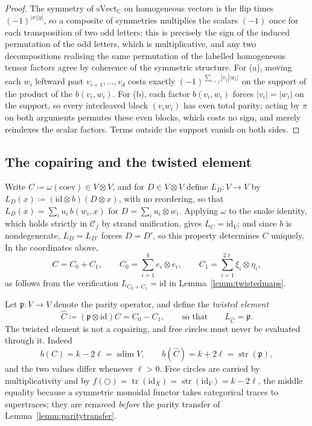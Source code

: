 \documentclass[11pt]{article}
\newcommand{\freecircle}{\bigcirc}
\newcommand{\conncat}{\mathcal{C}_{f}}            %
\newcommand{\genX}{X}                             %
\newcommand{\tr}{\operatorname{tr}}
\newcommand{\fib}{\omega}                         %
\newcommand{\svect}{\mathrm{sVect}_{\mathbb{C}}}
\newcommand{\str}{\operatorname{str}}
\newcommand{\parityop}{\mathfrak{p}}              %
\newcommand{\copair}{C}                           %
\newcommand{\twistedC}{\widehat{C}}               %
\begin{document}
\begin{proof}
The symmetry of $\svect$ on homogeneous vectors is the flip times
$(-1)^{|x||y|}$, so a composite of symmetries multiplies the
scalars $(-1)$ once for each transposition of two odd letters;
this is precisely the sign of the induced permutation of the odd
letters, which is multiplicative, and any two decompositions
realising the same permutation of the labelled homogeneous
tensor factors agree by coherence of the symmetric structure. For (a), moving each $w_{i}$ leftward past
$v_{i+1},\dotsc,v_{d}$ costs exactly
$(-1)^{\sum_{i<j}|v_{j}||w_{i}|}$ on the support of the product of
the $b(v_{i},w_{i})$. For (b), each factor $b(v_{i},w_{i})$
forces $|v_{i}|=|w_{i}|$ on the support, so every interleaved
block $(v_{i}w_{i})$ has even total parity; acting by $\pi$ on
both arguments permutes these even blocks, which costs no sign,
and merely reindexes the scalar factors. Terms outside the
support vanish on both sides.
\end{proof}

\subsection{The copairing and the twisted
element}\label{subsec:copairing}

Write $\copair\coloneqq\fib(\mathrm{coev})\in V\otimes V$, and for
$D\in V\otimes V$ define $L_{D}\colon V\to V$ by
$L_{D}(x)\coloneqq(\mathrm{id}\otimes b)(D\otimes x)$, with no
reordering, so that $L_{D}(x)=\sum_{i}u_{i}\,b(w_{i},x)$ for
$D=\sum_{i}u_{i}\otimes w_{i}$. Applying $\fib$ to the snake
identity, which holds strictly in $\conncat$ by strand
unification, gives $L_{\copair}=\mathrm{id}_{V}$; and since $b$ is
nondegenerate, $L_{D}=L_{D'}$ forces $D=D'$, so this property
determines $\copair$ uniquely. In the coordinates above,
\[
\copair=\copair_{0}+\copair_{1},
\qquad
\copair_{0}=\sum_{i=1}^{k}e_{i}\otimes e_{i},
\qquad
\copair_{1}=\sum_{i=1}^{2\ell}\xi_{i}\otimes\eta_{i},
\]
as follows from the verification $L_{\copair_{0}+\copair_{1}}
=\mathrm{id}$ in Lemma~\ref{lemm:twistedmaps}.

Let $\parityop\colon V\to V$ denote the parity operator, and
define the \emph{twisted element}
\[
\twistedC\coloneqq(\parityop\otimes\mathrm{id})\copair
=\copair_{0}-\copair_{1},
\qquad\text{so that}\qquad
L_{\twistedC}=\parityop .
\]
The twisted element is not a copairing, and free circles must
never be evaluated through it. Indeed
\[
b(\copair)=k-2\ell=\operatorname{sdim}V,
\qquad
b(\twistedC)=k+2\ell=\str(\parityop),
\]
and the two values differ whenever $\ell>0$. Free circles are
carried by multiplicativity and by
$f(\freecircle)=\tr(\mathrm{id}_{\genX})
=\str(\mathrm{id}_{V})=k-2\ell$, the middle equality because a
symmetric monoidal functor takes categorical traces to
supertraces; they are removed \emph{before} the parity transfer of
Lemma~\ref{lemm:paritytransfer}.
\end{document}
